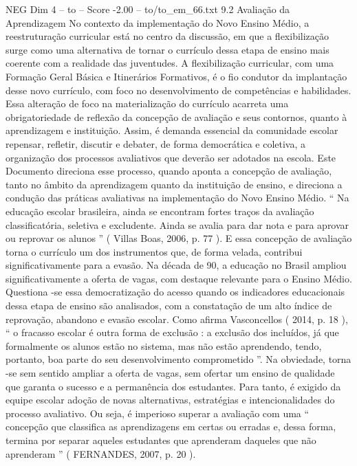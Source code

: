 \begin{textsample}{NEG Dim 4 – to – Score -2.00 – to/to\_em\_66.txt}  \label{ex:f4_neg_082}
9.2 Avaliação da Aprendizagem No contexto da implementação do Novo Ensino Médio, a reestruturação curricular está no centro da discussão, em que a flexibilização surge como uma alternativa de tornar o currículo dessa etapa de ensino mais coerente com a realidade das juventudes.
A flexibilização curricular, com uma Formação Geral Básica e Itinerários Formativos, é o fio condutor da implantação desse novo currículo, com foco no desenvolvimento de competências e habilidades.
Essa alteração de foco na materialização do currículo acarreta uma obrigatoriedade de reflexão da concepção de avaliação e seus contornos, quanto à aprendizagem e instituição.
Assim, é demanda essencial da comunidade escolar repensar, refletir, discutir e debater, de forma democrática e coletiva, a organização dos processos avaliativos que deverão ser adotados na escola.
Este Documento direciona esse processo, quando aponta a concepção de avaliação, tanto no âmbito da aprendizagem quanto da instituição de ensino, e direciona a condução das práticas avaliativas na implementação do Novo Ensino Médio. “ Na educação escolar brasileira, ainda se encontram fortes traços da avaliação classificatória, seletiva e excludente.
Ainda se avalia para dar nota e para aprovar ou reprovar os alunos ” ( Villas Boas, 2006, p. 77 ).
E essa concepção de avaliação torna o currículo um dos instrumentos que, de forma velada, contribui significativamente para a evasão.
Na década de 90, a educação no Brasil ampliou significativamente a oferta de vagas, com destaque relevante para o Ensino Médio.
Questiona -se essa democratização do acesso quando os indicadores educacionais dessa etapa de ensino são analisados, com a constatação de um alto índice de reprovação, abandono e evasão escolar.
Como afirma Vasconcellos ( 2014, p. 18 ), “ o fracasso escolar é outra forma de exclusão : a exclusão dos incluídos, já que formalmente os alunos estão no sistema, mas não estão aprendendo, tendo, portanto, boa parte do seu desenvolvimento comprometido ”.
Na obviedade, torna -se sem sentido ampliar a oferta de vagas, sem ofertar um ensino de qualidade que garanta o sucesso e a permanência dos estudantes.
Para tanto, é exigido da equipe escolar adoção de novas alternativas, estratégias e intencionalidades do processo avaliativo.
Ou seja, é imperioso superar a avaliação com uma “ concepção que classifica as aprendizagens em certas ou erradas e, dessa forma, termina por separar aqueles estudantes que aprenderam daqueles que não aprenderam ” ( FERNANDES, 2007, p. 20 ).

\end{textsample}
